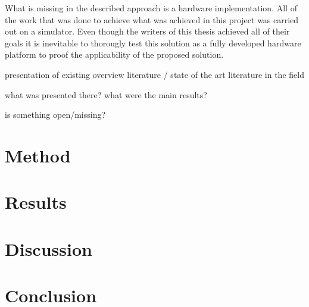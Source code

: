 \documentclass[12pt,a4paper,titlepage,oneside]{scrartcl}
\begin{document}
What is missing in the described approach is a hardware implementation.
All of the work that was done to achieve what was achieved in this project was carried out on a simulator.
Even though the writers of this thesis achieved all of their goals it is inevitable to thorougly test this solution as a fully developed hardware platform to proof the applicability of the proposed solution.
\cite{Davidsson2016}



presentation of existing overview literature / state of the art literature in the field

what was presented there? what were the main results?

is something open/missing?


\section{Method}
\section{Results}
\section{Discussion}
\section{Conclusion}




\end{document}
